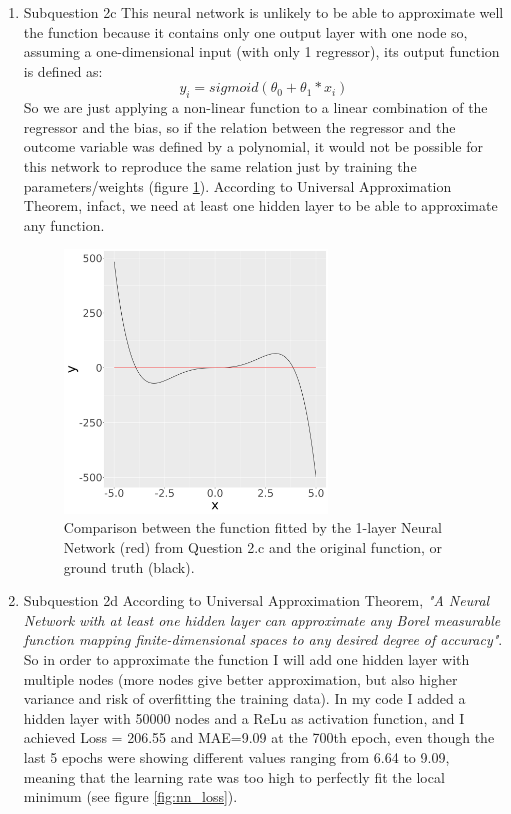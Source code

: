 \documentclass[12pt,twoside]{article}
\begin{document}
\begin{enumerate}
\begin{enumerate}
	\item Subquestion 2c 
	This neural network is unlikely to be able to approximate well the function because it contains only one output layer with one node so, assuming a one-dimensional input (with only 1 regressor), its output function is defined as:
	\begin{equation}
		y_i=sigmoid(\theta_{0}+\theta_1*x_i)
	\end{equation}
	So we are just applying a non-linear function to a linear combination of the regressor and the bias, so if the relation between the regressor and the outcome variable was defined by a polynomial, it would not be possible for this network to reproduce the same relation just by training the parameters/weights (figure \ref{fig:one_layer_preds}).
	According to Universal Approximation Theorem, infact, we need at least one hidden layer to be able to approximate any function.
	\begin{figure}[H]\centering
		\includegraphics[width=7cm]{one_layer_preds}
		\caption{Comparison between the function fitted by the 1-layer Neural Network (red) from Question 2.c and the original function, or ground truth (black).}
		\label{fig:one_layer_preds}
	\end{figure}
	\item Subquestion 2d According to Universal Approximation Theorem, \textit{"A Neural Network with at least one hidden layer can approximate any Borel measurable function mapping finite-dimensional spaces to any desired degree of accuracy"}.
	So in order to approximate the function I will add one hidden layer with multiple nodes (more nodes give better approximation, but also higher variance and risk of overfitting the training data).
	In my code I added a hidden layer with 50000 nodes and a ReLu as activation function, and I achieved Loss = 206.55 and MAE=9.09 at the 700th epoch, even though the last 5 epochs were showing different values ranging from 6.64 to 9.09, meaning that the learning rate was too high to perfectly fit the local minimum (see figure \ref{fig:nn_loss}).

\end{enumerate}
\end{enumerate}
\end{document}
